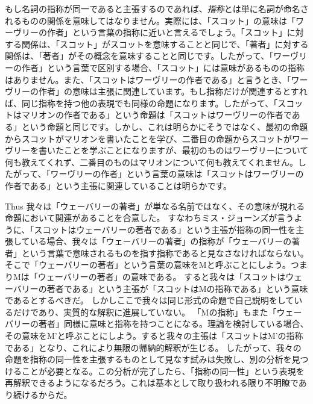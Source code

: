 \documentclass[a4paper,11pt,openany]{ltjsbook}
\begin{document}
もし名詞の指称が同一であると主張するのであれば、\textit{指称}とは単に名詞が命名されるものの関係を意味してはなりません。実際には、「スコット」の意味は「ワーヴリーの作者」という言葉の指称に近いと言えるでしょう。「スコット」に対する関係は、「スコット」がスコットを意味することと同じで、「著者」に対する関係は、「著者」がその概念を意味することと同じです。したがって、「ワーヴリーの作者」という言葉で区別する場合、「スコット」には意味があるものの指称はありません。また、「スコットはワーヴリーの作者である」と言うとき、「ワーヴリーの作者」の意味は主張に関連しています。もし指称だけが関連するとすれば、同じ指称を持つ他の表現でも同様の命題になります。したがって、「スコットはマリオンの作者である」という命題は「スコットはワーヴリーの作者である」という命題と同じです。しかし、これは明らかにそうではなく、最初の命題からスコットがマリオンを書いたことを学び、二番目の命題からスコットがワーヴリーを書いたことを学ぶことになりますが、最初のものはワーヴリーについて何も教えてくれず、二番目のものはマリオンについて何も教えてくれません。したがって、「ワーヴリーの作者」という言葉の意味は「スコットはワーヴリーの作者である」という主張に関連していることは明らかです。

Thus 我々は「ウェーバリーの著者」が単なる名前ではなく、その意味が現れる命題において関連があることを合意した。
すなわちミス・ジョーンズが言うように、「スコットはウェーバリーの著者である」という主張が指称の同一性を主張している場合、我々は「ウェーバリーの著者」の指称が「ウェーバリーの著者」という言葉で意味されるものを指す指称であると見なさなければならない。
そこで「ウェーバリーの著者」という言葉の意味をMと呼ぶことにしよう。つまりMは「ウェーバリーの著者」の意味である。
すると我々は「スコットはウェーバリーの著者である」という主張が「スコットはMの指称である」という意味であるとするべきだ。
しかしここで我々は同じ形式の命題で自己説明をしているだけであり、実質的な解釈に進展していない。
「Mの指称」もまた「ウェーバリーの著者」同様に意味と指称を持つことになる。理論を検討している場合、その意味をM'と呼ぶことにしよう。すると我々の主張は「スコットはM'の指称である」となり、これにより無限の帰納的解釈が生じる。
したがって、我々の命題を指称の同一性を主張するものとして見なす試みは失敗し、別の分析を見つけることが必要となる。この分析が完了したら、「指称の同一性」という表現を再解釈できるようになるだろう。これは基本として取り扱われる限り不明瞭であり続けるからだ。
\end{document}
